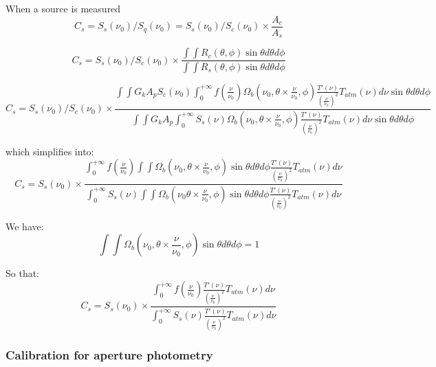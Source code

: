 When a source is measured 
\begin{equation} 
C_{s} = S_{s} (\nu_{0}) / S_{q}(\nu_{0}) = S_{s}(\nu_0) / S_{c} (\nu_{0})  \times \frac{A_{c}}{A_{s}}
\end{equation}


\begin{equation} 
C_{s} = S_{s}(\nu_{0}) / S_{c} (\nu_{0})  \times \frac{\int \int
R_{c}(\theta, \phi) \sin \theta d\theta d\phi }{\int \int
R_{s}(\theta, \phi) \sin \theta d\theta d\phi }
\end{equation}

\begin{equation}
C_{s} = S_{s}(\nu_{0}) / S_{c} (\nu_{0})  \times \frac{
  \int\int G_{k} A_{p} S_{c}(\nu_{0})\int_{0}^{+\infty} f(\frac{\nu}{\nu_{0}}) \Omega_{b}(\nu_{0}, \theta \times \frac{\nu}{\nu_{0}},
\phi) \frac{T'(\nu)}{\left(\frac{\nu}{\nu_{0}}\right)^{2}} 
T_{atm}(\nu) d\nu \sin \theta d\theta d\phi}
{\int \int G_{k}
A_{p} \int_{0}^{+\infty} S_{s}(\nu) \Omega_{b}(\nu_{0}, \theta \times \frac{\nu}{\nu_{0}},
\phi) \frac{T'(\nu)}{\left(\frac{\nu}{\nu_{0}}\right)^{2}} 
T_{atm}(\nu) d\nu \sin \theta d\theta d\phi
}
\end{equation}

which simplifies into:
\begin{equation}
C_{s} = S_{s}(\nu_{0})  \times \frac{
  \int_{0}^{+\infty} f(\frac{\nu}{\nu_{0}}) \int\int \Omega_{b}(\nu_{0}, \theta \times \frac{\nu}{\nu_{0}},
\phi)  \sin \theta d\theta d\phi \frac{T'(\nu)}{\left(\frac{\nu}{\nu_{0}}\right)^{2}} 
T_{atm}(\nu) d\nu}
{
\int_{0}^{+\infty} S_{s}(\nu) \int \int \Omega_{b}(\nu_{0} \theta \times \frac{\nu}{\nu_{0}},
\phi) \sin \theta  d\theta d\phi \frac{T'(\nu)}{\left(\frac{\nu}{\nu_{0}}\right)^{2}} 
T_{atm}(\nu) d\nu 
}
\end{equation}

We have:
\begin{equation}
\int\int \Omega_{b}(\nu_{0}, \theta \times \frac{\nu}{\nu_{0}},
\phi)  \sin \theta  d\theta d\phi = 1
\end{equation}

So that:
\begin{equation}
C_{s} = S_{s}(\nu_{0})  \times \frac{
  \int_{0}^{+\infty} f(\frac{\nu}{\nu_{0}}) \frac{T'(\nu)}{\left(\frac{\nu}{\nu_{0}}\right)^{2}} 
T_{atm}(\nu) d\nu}
{
\int_{0}^{+\infty} S_{s}(\nu)  \frac{T'(\nu)}{\left(\frac{\nu}{\nu_{0}}\right)^{2}} 
T_{atm}(\nu) d\nu 
}
\end{equation}


\subsubsection{Calibration for aperture photometry}

